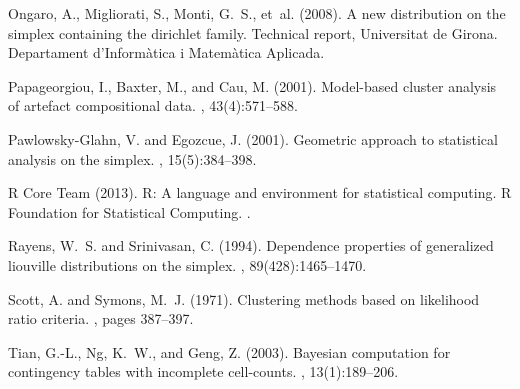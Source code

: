 \documentclass[preprint, review, 3p, authoryear]{elsarticle}
\begin{document}
\begin{thebibliography}{00}
Ongaro, A., Migliorati, S., Monti, G.~S., et~al. (2008).
\newblock A new distribution on the simplex containing the dirichlet family.
\newblock Technical report, Universitat de Girona. Departament
  d'Inform{\`a}tica i Matem{\`a}tica Aplicada.

Papageorgiou, I., Baxter, M., and Cau, M. (2001).
\newblock Model-based cluster analysis of artefact compositional data.
, 43(4):571--588.


Pawlowsky-Glahn, V. and Egozcue, J. (2001).
\newblock Geometric approach to statistical analysis on the simplex.
,
  15(5):384--398.

R Core Team (2013).
\newblock R: A language and environment for statistical computing. R Foundation for Statistical Computing.
.

Rayens, W.~S. and Srinivasan, C. (1994).
\newblock Dependence properties of generalized liouville distributions on the
  simplex.
,
  89(428):1465--1470.

Scott, A. and Symons, M.~J. (1971).
\newblock Clustering methods based on likelihood ratio criteria.
, pages 387--397.

Tian, G.-L., Ng, K.~W., and Geng, Z. (2003).
\newblock Bayesian computation for contingency tables with incomplete
  cell-counts.
, 13(1):189--206.

\end{thebibliography}
\end{document}
